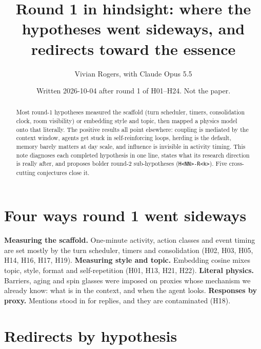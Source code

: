 \documentclass[aps,pre,reprint,10pt,nofootinbib]{revtex4-2}
\begin{document}
\title{Round 1 in hindsight: where the hypotheses went sideways, and redirects toward the essence}
\author{Vivian Rogers, with Claude Opus 5.5}
\date[]{Written 2026-10-04 after round 1 of H01--H24. Not the paper.}
\begin{abstract}
Most round-1 hypotheses measured the scaffold (turn scheduler, timers, consolidation clock, room visibility) or embedding style and topic, then mapped a physics model onto that literally. The positive results all point elsewhere: coupling is mediated by the context window, agents get stuck in self-reinforcing loops, herding is the default, memory barely matters at day scale, and influence is invisible in activity timing. This note diagnoses each completed hypothesis in one line, states what its research direction is really after, and proposes bolder round-2 sub-hypotheses (\texttt{H<NN>-R<k>}). Five cross-cutting conjectures close it.
\end{abstract}
\maketitle
\section*{Four ways round 1 went sideways}
\textbf{Measuring the scaffold.} One-minute activity, action classes and event timing are set mostly by the turn scheduler, timers and consolidation (H02, H03, H05, H14, H16, H17, H19).
\textbf{Measuring style and topic.} Embedding cosine mixes topic, style, format and self-repetition (H01, H13, H21, H22).
\textbf{Literal physics.} Barriers, aging and spin glasses were imposed on proxies whose mechanism we already know: what is in the context, and when the agent looks.
\textbf{Responses by proxy.} Mentions stood in for replies, and they are contaminated (H18).
\section*{Redirects by hypothesis}
\end{document}
